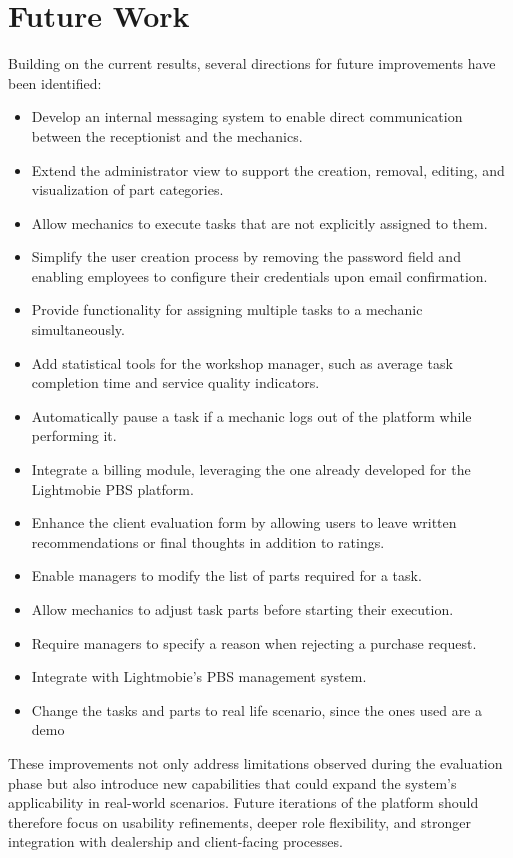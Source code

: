 \section{Future Work}

Building on the current results, several directions for future improvements have been identified:

\begin{itemize}
    \item Develop an internal messaging system to enable direct communication between the receptionist and the mechanics.
    \item Extend the administrator view to support the creation, removal, editing, and visualization of part categories.
    \item Allow mechanics to execute tasks that are not explicitly assigned to them.
    \item Simplify the user creation process by removing the password field and enabling employees to configure their credentials upon email confirmation.
    \item Provide functionality for assigning multiple tasks to a mechanic simultaneously.
    \item Add statistical tools for the workshop manager, such as average task completion time and service quality indicators.
    \item Automatically pause a task if a mechanic logs out of the platform while performing it.
    \item Integrate a billing module, leveraging the one already developed for the Lightmobie \acs{PBS} platform.
    \item Enhance the client evaluation form by allowing users to leave written recommendations or final thoughts in addition to ratings.
    \item Enable managers to modify the list of parts required for a task.
    \item Allow mechanics to adjust task parts before starting their execution.
    \item Require managers to specify a reason when rejecting a purchase request.
    \item Integrate with Lightmobie's \ac{PBS} management system.
    \item Change the tasks and parts to real life scenario, since the ones used are a demo
\end{itemize}

These improvements not only address limitations observed during the evaluation phase but also introduce new capabilities that could expand the system's applicability in real-world scenarios. Future iterations of the platform should therefore focus on usability refinements, deeper role flexibility, and stronger integration with dealership and client-facing processes.
 